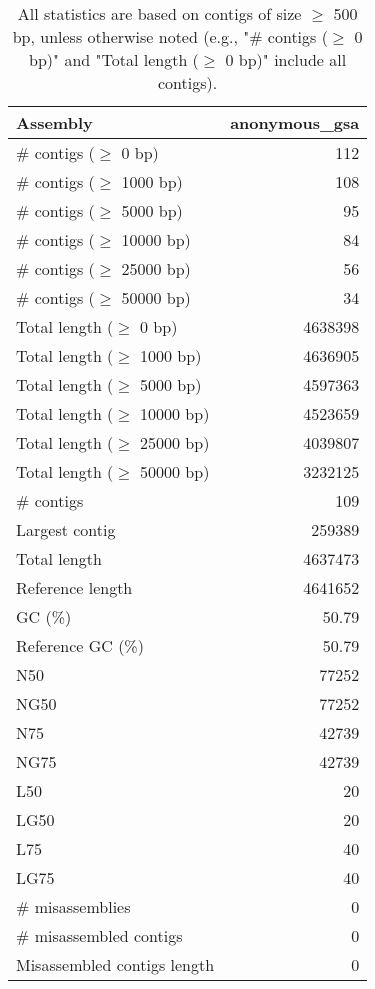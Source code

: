 \documentclass[12pt,a4paper]{article}
\begin{document}
\begin{table}[ht]
\begin{center}
\caption{All statistics are based on contigs of size $\geq$ 500 bp, unless otherwise noted (e.g., "\# contigs ($\geq$ 0 bp)" and "Total length ($\geq$ 0 bp)" include all contigs).}
\begin{tabular}{|l*{1}{|r}|}
\hline
Assembly & anonymous\_gsa \\ \hline
\# contigs ($\geq$ 0 bp) & 112 \\ \hline
\# contigs ($\geq$ 1000 bp) & 108 \\ \hline
\# contigs ($\geq$ 5000 bp) & 95 \\ \hline
\# contigs ($\geq$ 10000 bp) & 84 \\ \hline
\# contigs ($\geq$ 25000 bp) & 56 \\ \hline
\# contigs ($\geq$ 50000 bp) & 34 \\ \hline
Total length ($\geq$ 0 bp) & 4638398 \\ \hline
Total length ($\geq$ 1000 bp) & 4636905 \\ \hline
Total length ($\geq$ 5000 bp) & 4597363 \\ \hline
Total length ($\geq$ 10000 bp) & 4523659 \\ \hline
Total length ($\geq$ 25000 bp) & 4039807 \\ \hline
Total length ($\geq$ 50000 bp) & 3232125 \\ \hline
\# contigs & 109 \\ \hline
Largest contig & 259389 \\ \hline
Total length & 4637473 \\ \hline
Reference length & 4641652 \\ \hline
GC (\%) & 50.79 \\ \hline
Reference GC (\%) & 50.79 \\ \hline
N50 & 77252 \\ \hline
NG50 & 77252 \\ \hline
N75 & 42739 \\ \hline
NG75 & 42739 \\ \hline
L50 & 20 \\ \hline
LG50 & 20 \\ \hline
L75 & 40 \\ \hline
LG75 & 40 \\ \hline
\# misassemblies & 0 \\ \hline
\# misassembled contigs & 0 \\ \hline
Misassembled contigs length & 0 \\ \hline

\end{tabular}
\end{center}
\end{table}
\end{document}
